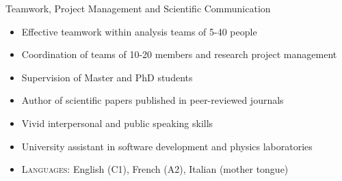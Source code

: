 \begin{cvskills}
\cvskill
{Teamwork, Project Management and Scientific Communication} %
{
\begin{minipage}{0.49\textwidth}
\vspace{0.3em}
\begin{itemize}[labelwidth=\the\widest,align=right,leftmargin=!,labelsep=1pt,noitemsep]
\item[\custItem] Effective teamwork within analysis teams of 5-40 people
\item[\custItem] Coordination of teams of 10-20 members and research project
management
\item[\custItem] Supervision of Master and PhD students
\end{itemize}
\end{minipage}
\hfill
\begin{minipage}{0.49\textwidth}
\vspace{0.3em}
\begin{itemize}[labelwidth=\the\widest,align=right,leftmargin=!,labelsep=1pt,noitemsep]
\item[\custItem] Author of scientific papers published in peer-reviewed
journals
\item[\custItem] Vivid interpersonal and public speaking skills
\item[\custItem] University assistant in software development and physics
laboratories
\end{itemize}
\end{minipage}
\begin{itemize}[labelwidth=\the\widest,align=right,leftmargin=!,labelsep=1pt,noitemsep]
\item[] \textsc{\color{awesome}Languages:} English (C1), French (A2),
Italian (mother tongue)
\end{itemize}
}
%

\end{cvskills}
